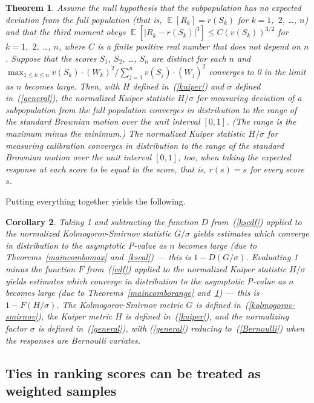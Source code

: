 \documentclass[12pt]{article}
\newtheorem{theorem}{Theorem}[]
\newtheorem{corollary}[theorem]{Corollary}
\DeclareMathOperator{\E}{\mathop{}\mathbb{E}}
\begin{document}
\begin{theorem}
\label{kucal}
Assume the null hypothesis that the subpopulation has no expected deviation
from the full population (that is, $\E[R_k] = r(S_k)$
for $k = 1$,~$2$, \dots, $n$) and that the third moment obeys
$\E[|R_k - r(S_k)|^3] \le C (v(S_k))^{3/2}$ for $k = 1$,~$2$, \dots, $n$,
where $C$ is a finite positive real number that does not depend on $n$.
Suppose that the scores $S_1$, $S_2$, \dots, $S_n$ are distinct for each $n$
and
$\max_{1 \le k \le n} v(S_k) \cdot (W_k)^2 / \sum_{j=1}^n v(S_j) \cdot (W_j)^2$
converges to 0 in the limit as $n$ becomes large.
Then, with $H$ defined in~(\ref{kuiper})
and $\sigma$ defined in~(\ref{general}),
the normalized Kuiper statistic $H/\sigma$
for measuring deviation of a subpopulation from the full population
converges in distribution to the range of the standard Brownian motion
over the unit interval $[0, 1]$.
(The range is the maximum minus the minimum.)
The normalized Kuiper statistic $H/\sigma$ for measuring calibration
converges in distribution to the range of the standard Brownian motion
over the unit interval $[0, 1]$, too, when taking the expected response
at each score to be equal to the score, that is, $r(s) = s$
for every score $s$.
\end{theorem}

Putting everything together yields the following.
%
\begin{corollary}
\label{corollary}
Taking 1 and subtracting the function $D$ from~(\ref{kscdf})
applied to the normalized Kolmogorov-Smirnov statistic $G/\sigma$
yields estimates which converge in distribution to the asymptotic P-value
as $n$ becomes large (due to Theorems~\ref{maincombomax}
and~\ref{kscal}) --- this is $1 - D(G/\sigma)$.
Evaluating 1 minus the function $F$ from~(\ref{cdf})
applied to the normalized Kuiper statistic $H/\sigma$
yields estimates which converge in distribution to the asymptotic P-value
as $n$ becomes large (due to Theorems~\ref{maincomborange}
and~\ref{kucal}) --- this is $1 - F(H/\sigma)$.
The Kolmogorov-Smirnov metric $G$ is defined in~(\ref{kolmogorov-smirnov}),
the Kuiper metric $H$ is defined in~(\ref{kuiper}),
and the normalizing factor $\sigma$ is defined in~(\ref{general}),
with (\ref{general}) reducing to~(\ref{Bernoulli})
when the responses are Bernoulli variates.
\end{corollary}



\subsection{Ties in ranking scores can be treated as weighted samples}
\label{reduction}
\end{document}
